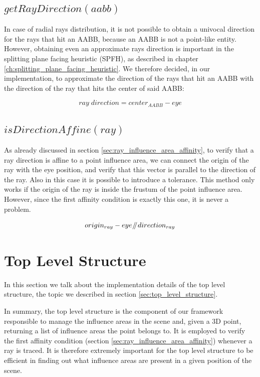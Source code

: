 \documentclass{PoliMi_MasterThesis}
\begin{document}
\subsection*{$getRayDirection(aabb)$}
In case of radial rays distribution, it is not possible to obtain a univocal direction for the rays that hit an AABB, because an AABB is not a point-like entity. However, obtaining even an approximate rays direction is important in the splitting plane facing heuristic (SPFH), as described in chapter \ref{ch:splitting_plane_facing_heuristic}. We therefore decided, in our implementation, to approximate the direction of the rays that hit an AABB with the direction of the ray that hits the center of said AABB:

$$ray\; direction = center_{AABB} - eye$$

\subsection*{$isDirectionAffine(ray)$}
As already discussed in section \ref{sec:ray_influence_area_affinity}, to verify that a ray direction is affine to a point influence area, we can connect the origin of the ray with the eye position, and verify that this vector is parallel to the direction of the ray. Also in this case it is possible to introduce a tolerance. This method only works if the origin of the ray is inside the frustum of the point influence area. However, since the first affinity condition is exactly this one, it is never a problem.

$$origin_{ray} - eye \mathbin{\!/\mkern-5mu/\!} direction_{ray}$$

\section{Top Level Structure} \label{sec:top_level}
In this section we talk about the implementation details of the top level structure, the topic we described in section \ref{sec:top_level_structure}.

In summary, the top level structure is the component of our framework responsible to manage the influence areas in the scene and, given a 3D point, returning a list of influence areas the point belongs to. It is employed to verify the first affinity condition (section \ref{sec:ray_influence_area_affinity}) whenever a ray is traced. It is therefore extremely important for the top level structure to be efficient in finding out what influence areas are present in a given position of the scene.
\end{document}
